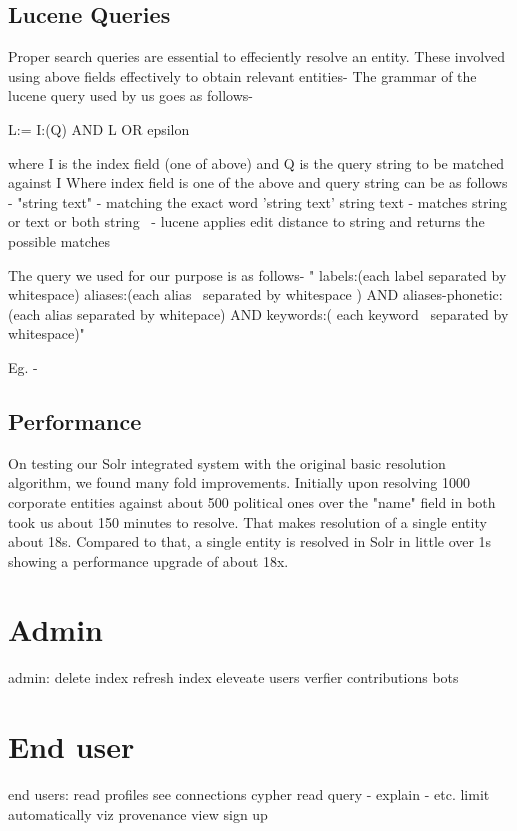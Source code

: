 \subsection{Lucene Queries}
    Proper search queries are essential to effeciently resolve an entity. These involved using above fields effectively to obtain relevant entities- 
    The grammar of the lucene query used by us goes as follows-

    L:= I:(Q) AND L OR epsilon

    where I is the index field (one of above) and Q is the query string to be matched against I
    Where index field is one of the above and query string can be as follows -
    "string text" - matching the exact word 'string text'
    string text - matches string or text or both
    string~ - lucene applies edit distance to string and returns the possible matches

    The query we used for our purpose is as follows-
    " labels:(each label separated by whitespace) aliases:(each alias~ separated by whitespace ) AND aliases-phonetic:(each alias separated by whitepace) AND keywords:( each keyword~ separated by whitespace)"

    Eg. - 
\subsection{Performance}
    On testing our Solr integrated system with the original basic resolution algorithm, we found many fold improvements. Initially upon resolving 1000 corporate entities against about 500 political ones over the "name" field in both took us about 150 minutes to resolve. That makes resolution of a single entity about 18s.
    Compared to that, a single entity is resolved in Solr in little over 1s showing a performance upgrade of about 18x.



\section{Admin}
admin:
delete index
refresh index
eleveate users
verfier contributions
bots


\section{End user}
end users:
read profiles
see connections
cypher read query - explain - etc.
limit automatically
viz
provenance view
sign up\\


